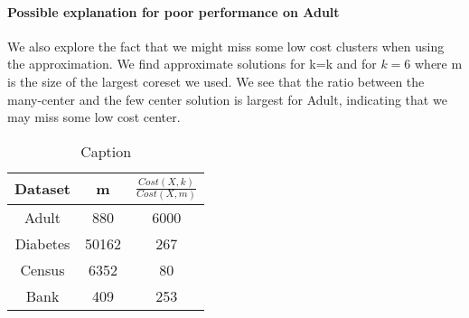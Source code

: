 \paragraph{Possible explanation for poor performance on Adult}
We also explore the fact that we might miss some low cost clusters when using the approximation. We find approximate solutions for k=k and for $k=6$ where m is the size of the largest coreset we used. We see that the ratio between the many-center and the few center solution is largest for Adult, indicating that we may miss some low cost center.
\begin{table}[ht]
    \centering
    \begin{tabular}{c|c|c}
    Dataset & m & $\frac{Cost(X, k)}{Cost(X,m)}$\\
    \hline
        Adult & 880& 6000 \\
        Diabetes & 50162& 267 \\
        Census &6352& 80\\
        Bank &  409 & 253
    \end{tabular}
    \caption{Caption}
    \label{tab:my_label}
\end{table}


